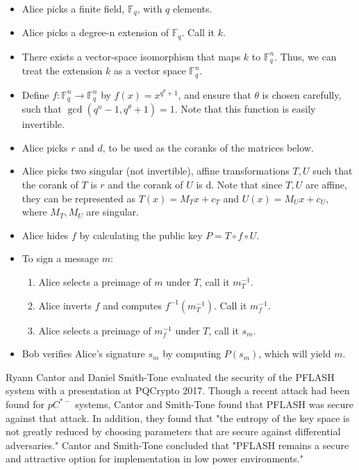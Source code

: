 \documentclass{article}
\begin{document}
\begin{itemize}
	\item Alice picks a finite field, $ \mathbb{F}_q $, with $ q $ elements.
	\item Alice picks a degree-n extension of $ \mathbb{F}_q $. Call it $ k $.
	\item There exists a vector-space isomorphism that maps $ k $ to $ \mathbb{F}^n_q $. Thus, we can treat the extension $ k $ as a vector space $ \mathbb{F}^n_q $.
	\item Define $ f: \mathbb{F}^n_q \rightarrow \mathbb{F}^n_q $ by $ f(x) = x^{q^\theta + 1} $, and ensure that $ \theta $ is chosen carefully, such that $ \gcd (q^n - 1, q^\theta + 1) = 1 $. Note that this function is easily invertible.
	\item Alice picks $ r $ and $ d $, to be used as the coranks of the matrices below.
	\item Alice picks two singular (not invertible), affine transformations $ T, U $ such that the corank of $ T $ is $ r $ and the corank of $ U $ is d. Note that since $ T, U $ are affine, they can be represented as $ T(x) = M_T x + c_T $ and $ U(x) = M_U x + c_U $, where $ M_T, M_U $ are singular.
	\item Alice hides $ f $ by calculating the public key $ P = T \circ f \circ U $.
	\item To sign a message $ m $:
	\begin{enumerate}
		\item Alice selects a preimage of $ m $ under $ T $, call it $ m^{-1}_T $.
		\item Alice inverts $ f $ and computes $ f^{-1}(m^{-1}_T) $. Call it $ m^{-1}_f $.
		\item Alice selects a preimage of $ m^{-1}_f $ under $ T $, call it $ s_m $.
	\end{enumerate}
	\item Bob verifies Alice's signature $ s_m $ by computing $ P(s_m) $, which will yield $ m $.
\end{itemize}

Ryann Cantor and Daniel Smith-Tone evaluated the security of the PFLASH system with a presentation at PQCrypto 2017. Though a recent attack had been found for $ p C^{*-} $ systems, Cantor and Smith-Tone found that PFLASH was secure against that attack. In addition, they found that "the entropy of the key space is not greatly reduced by choosing parameters that are secure against differential adversaries." Cantor and Smith-Tone concluded that "PFLASH remains a secure and attractive option for implementation in low power environments."\cite{cartor17pflash}
\end{document}
